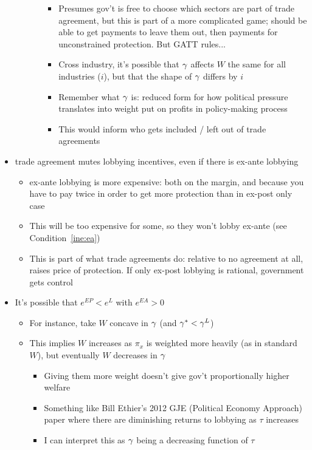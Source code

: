 \begin{itemize}
\begin{itemize}
\begin{itemize}
\begin{itemize}
							\item Presumes gov't is free to choose which sectors are part of trade agreement, but this is part of a more complicated game; should be able to get payments to leave them out, then payments for unconstrained protection. But GATT rules...
							\item Cross industry, it's possible that $\gamma$ affects $W$ the same for all industries ($i$), but that the shape of $\gamma$ differs by $i$
							\item Remember what $\gamma$ is: reduced form for how political pressure translates into weight put on profits in policy-making process
							\item This would inform who gets included / left out of trade agreements
						\end{itemize}
					\end{itemize}
		\end{itemize}
	\item trade agreement mutes lobbying incentives, even if there is ex-ante lobbying
		\begin{itemize}
			\item ex-ante lobbying is more expensive: both on the margin, and because you have to pay twice in order to get more protection than in ex-post only case
			\item This will be too expensive for some, so they won't lobby ex-ante (see Condition~\ref{ine:ea})
			\item This is part of what trade agreements do: relative to no agreement at all, raises price of protection. If only ex-post lobbying is rational, government gets control
		\end{itemize}

		
	 \item It's possible that $e^{EP} < e^{L}$ with $e^{EA} > 0$
		\begin{itemize}
			\item For instance, take $W$ concave in $\gamma$ (and $\gamma^* < \gamma^L$)
			\item This implies $W$ increases as $\pi_x$ is weighted more heavily (as in standard $W$), but eventually $W$ decreases in $\gamma$
				\begin{itemize}
					\item Giving them more weight doesn't give gov't proportionally higher welfare
					\item Something like Bill Ethier's 2012 GJE (Political Economy Approach) paper where there are diminishing returns to lobbying as $\tau$ increases
					\item I can interpret this as $\gamma$ being a decreasing function of $\tau$
				\end{itemize}
		\end{itemize}
\end{itemize}



